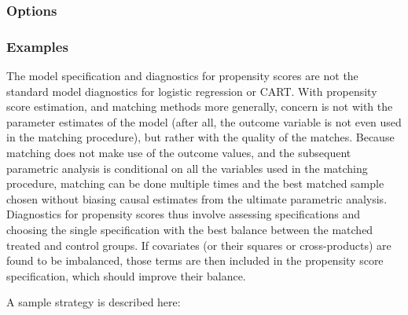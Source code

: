 \documentclass[oneside,letterpaper,titlepage]{article}
\begin{document}
\subsubsection{Options}

\subsubsection{Examples}

The model specification and diagnostics for propensity scores are not
the standard model diagnostics for logistic regression or CART.  With
propensity score estimation, and matching methods more generally,
concern is not with the parameter estimates of the model (after all,
the outcome variable is not even used in the matching procedure), but
rather with the quality of the matches.  Because matching does not
make use of the outcome values, and the subsequent parametric analysis
is conditional on all the variables used in the matching procedure,
matching can be done multiple times and the best matched sample chosen
without biasing causal estimates from the ultimate parametric
analysis.  Diagnostics for propensity scores thus involve assessing
specifications and choosing the single specification with the best
balance between the matched treated and control groups.  If covariates
(or their squares or cross-products) are found to be imbalanced, those
terms are then included in the propensity score specification, which
should improve their balance.  

A sample strategy is described here:
\end{document}
